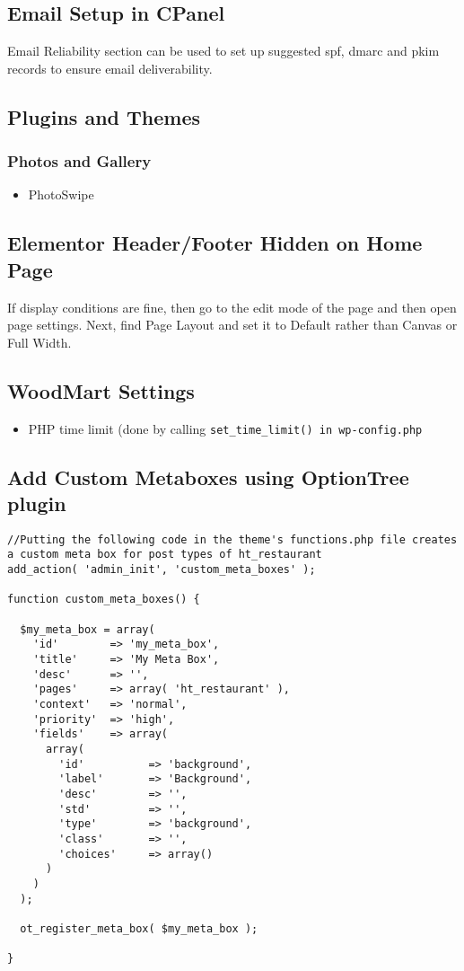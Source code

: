 \documentclass{article}
\begin{document}
\subsection{Email Setup in CPanel}
Email Reliability section can be used to set up suggested spf, dmarc and pkim records to ensure email deliverability.


\subsection{Plugins and Themes}
\subsubsection{Photos and Gallery}
\begin{itemize}
	\item PhotoSwipe
	
\end{itemize}

\subsection{Elementor Header/Footer Hidden on Home Page}
If display conditions are fine, then go to the edit mode of the page and then open page settings. Next, find Page Layout and set it to Default rather than Canvas or Full Width.
\subsection{WoodMart Settings}
\begin{itemize}
 \item PHP time limit (done by calling \lstinline{set_time_limit() in wp-config.php}
\end{itemize}
\subsection{Add Custom Metaboxes using OptionTree plugin}
\begin{verbatim}
//Putting the following code in the theme's functions.php file creates a custom meta box for post types of ht_restaurant
add_action( 'admin_init', 'custom_meta_boxes' );

function custom_meta_boxes() {

  $my_meta_box = array(
    'id'        => 'my_meta_box',
    'title'     => 'My Meta Box',
    'desc'      => '',
    'pages'     => array( 'ht_restaurant' ),
    'context'   => 'normal',
    'priority'  => 'high',
    'fields'    => array(
      array(
        'id'          => 'background',
        'label'       => 'Background',
        'desc'        => '',
        'std'         => '',
        'type'        => 'background',
        'class'       => '',
        'choices'     => array()
      )
    )
  );
  
  ot_register_meta_box( $my_meta_box );

}
\end{verbatim}
\end{document}
